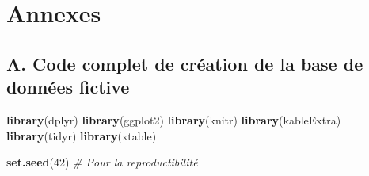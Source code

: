 \documentclass[
]{article}
\newenvironment{Shaded}{\begin{snugshade}}{\end{snugshade}}
\newcommand{\CommentTok}[1]{\textcolor[rgb]{0.56,0.35,0.01}{\textit{#1}}}
\newcommand{\DecValTok}[1]{\textcolor[rgb]{0.00,0.00,0.81}{#1}}
\newcommand{\FunctionTok}[1]{\textcolor[rgb]{0.13,0.29,0.53}{\textbf{#1}}}
\newcommand{\NormalTok}[1]{#1}
\begin{document}
\hypertarget{annexes}{%
\section{Annexes}\label{annexes}}

\hypertarget{a.-code-complet-de-cruxe9ation-de-la-base-de-donnuxe9es-fictive}{%
\subsection{A. Code complet de création de la base de données
fictive}\label{a.-code-complet-de-cruxe9ation-de-la-base-de-donnuxe9es-fictive}}

\begin{Shaded}
\begin{Highlighting}[]
\FunctionTok{library}\NormalTok{(dplyr)}
\FunctionTok{library}\NormalTok{(ggplot2)}
\FunctionTok{library}\NormalTok{(knitr)}
\FunctionTok{library}\NormalTok{(kableExtra)}
\FunctionTok{library}\NormalTok{(tidyr)}
\FunctionTok{library}\NormalTok{(xtable)}

\FunctionTok{set.seed}\NormalTok{(}\DecValTok{42}\NormalTok{)  }\CommentTok{\# Pour la reproductibilité}


\end{Highlighting}
\end{Shaded}
\end{document}
